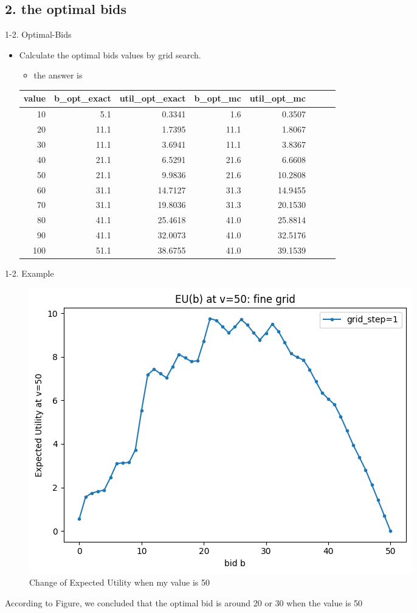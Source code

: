 \documentclass{beamer}
\begin{document}
\subsection{2. the optimal bids}
\begin{frame}{1-2. Optimal-Bids}
\begin{itemize}
    \item Calculate the optimal bids values by grid search.
    \begin{itemize}
        \item the answer is 
    \end{itemize} 
        {\small
        \begin{center}
        \begin{tabular}{@{}rrrrrrrr@{}}
        \toprule
        value & b\_opt\_exact & util\_opt\_exact & b\_opt\_mc & util\_opt\_mc \\
        \midrule
        10  &  5.1 &  0.3341 &  1.6 &  0.3507 \\
        20  & 11.1 &  1.7395 & 11.1 &  1.8067 \\
        30  & 11.1 &  3.6941 & 11.1 &  3.8367 \\
        40  & 21.1 &  6.5291 & 21.6 &  6.6608 \\
        50  & 21.1 &  9.9836 & 21.6 & 10.2808 \\
        60  & 31.1 & 14.7127 & 31.3 & 14.9455 \\
        70  & 31.1 & 19.8036 & 31.3 & 20.1530 \\
        80  & 41.1 & 25.4618 & 41.0 & 25.8814 \\
        90  & 41.1 & 32.0073 & 41.0 & 32.5176 \\
        100 & 51.1 & 38.6755 & 41.0 & 39.1539 \\
        \bottomrule
        \end{tabular}
        \end{center}}
\end{itemize}
\end{frame}

\begin{frame}{1-2. Example}
    \begin{figure}
        \centering
        \includegraphics[width=0.6\linewidth]{332Project1//figures/EU_plot_revised.png}
        \caption{Change of Expected Utility when my value is 50}
        \label{fig:placeholder}
    \end{figure}
    According to Figure, we concluded that the optimal bid is around 20 or 30 when the value is 50 
\end{frame}
\end{document}
